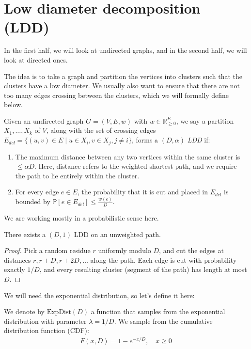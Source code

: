 \section{Low diameter decomposition (LDD)}

In the first half, we will look at undirected graphs, and in the second half, we will look at directed ones.

The idea is to take a graph and partition the vertices into clusters such that the clusters have a low diameter. We usually also want to ensure that there are not too many edges crossing between the clusters, which we will formally define below.

\begin{definicija}
    Given an undirected graph $G = (V, E, w)$ with $w \in \mathbb{R}_{\geq 0}^E$, we say a partition $X_1, \ldots, X_k$ of $V$, along with the set of crossing edges $E_{del} = \{(u,v) \in E \mid u \in X_i, v \in X_j, j \neq i\}$, forms a $(D, \alpha)$ \textit{LDD} if:
    \begin{enumerate}
        \item The maximum distance between any two vertices within the same cluster is $\leq \alpha D$. Here, distance refers to the weighted shortest path, and we require the path to lie entirely within the cluster.
        \item For every edge $e \in E$, the probability that it is cut and placed in $E_{del}$ is bounded by $\mathbb{P}[e \in E_{del}] \leq \frac{w(e)}{D}$.
    \end{enumerate}
\end{definicija}

We are working mostly in a probabilistic sense here.

\begin{primer}
    There exists a $(D,1)$ LDD on an unweighted path.
\end{primer}
\begin{proof}
    Pick a random residue $r$ uniformly modulo $D$, and cut the edges at distances $r, r+D, r+2D, \ldots$ along the path. Each edge is cut with probability exactly $1/D$, and every resulting cluster (segment of the path) has length at most $D$.
\end{proof}

We will need the exponential distribution, so let's define it here:

\begin{definicija}
    We denote by $\text{ExpDist}(D)$ a function that samples from the exponential distribution with parameter $\lambda = 1/D$. We sample from the cumulative distribution function (CDF):
    \begin{align*}
        F(x,D) = 1 - e^{-x/D}, \quad x \geq 0
    \end{align*}
\end{definicija}

